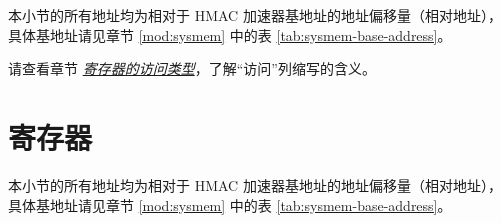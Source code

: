 \documentclass[main\_\_CN.tex]{subfiles}
\begin{document}
本小节的所有地址均为相对于 HMAC 加速器基地址的地址偏移量（相对地址），具体基地址请见章节 \ref{mod:sysmem} \textit{} 中的表 \ref{tab:sysmem-base-address}。

请查看章节 \hyperref[glossary-access-types]{\textit{寄存器的访问类型}}，了解“访问”列缩写的含义。






\clearpage
\section{寄存器}

本小节的所有地址均为相对于 HMAC 加速器基地址的地址偏移量（相对地址），具体基地址请见章节 \ref{mod:sysmem} \textit{} 中的表 \ref{tab:sysmem-base-address}。


\end{document}
